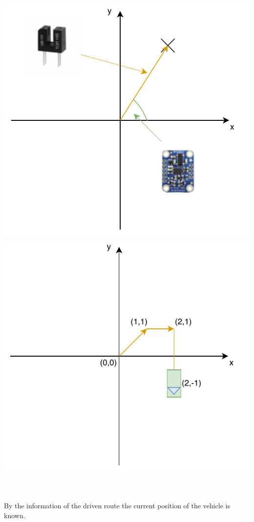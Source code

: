 \begin{minipage}{\textwidth}
	\centering
	\includegraphics[scale=0.6]{sources/mapping/orientation_distance.pdf}
	\includegraphics[scale=0.6]{sources/mapping/route.pdf}
\end{minipage}
\\
\\
By the information of the driven route the current position of the vehicle is known.

